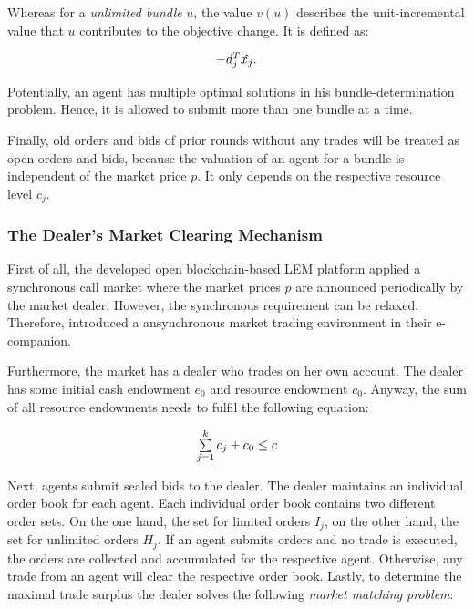 Whereas for a \textit{unlimited bundle} $u$, the value $v(u)$ describes the 
unit-incremental value that $u$ contributes to the objective change. It is defined
as:

\begin{equation*}
    \begin{array}{ll@{}ll}
        -d_{j}^{T}\hat{x_{j}}.
    \end{array}
\end{equation*}

Potentially, an agent has multiple optimal solutions in 
his bundle-determination problem. Hence, it is allowed to submit more than 
one bundle at a time. 

Finally, old orders and bids of prior rounds without any trades will be treated 
as open orders and bids, because the valuation of an agent for a bundle is
independent of the market price $p$.
It only depends on the respective resource level $c_{j}$. 

\subsubsection{The Dealer’s Market Clearing Mechanism}
\label{sec:market_clearing_mechanism}
First of all, the developed open blockchain-based LEM platform applied a synchronous 
call market where the market prices $p$ are announced periodically by the market dealer. 
However, the synchronous requirement can be relaxed. 
Therefore,  introduced a ansynchronous market trading 
environment in their e-companion. 

Furthermore, the market has a dealer who trades on her own account. 
The dealer has some initial cash endowment $e_{0}$ and resource endowment $c_{0}$.
Anyway, the sum of all resource endowments needs to fulfil the following equation:

\begin{equation*}
    \begin{array}{ll@{}ll}
        \sum\limits_{j=1}^{k} c_{j} + c_{0} \leq c
    \end{array}
\end{equation*}

Next, agents submit sealed bids to the dealer. The dealer maintains an 
individual order book for each agent. Each individual order book contains 
two different order sets. On the one hand, the set for limited orders $I_{j}$,
on the other hand, the set for unlimited orders $H_{j}$.
If an agent submits orders and no trade is executed, the orders are collected and 
accumulated for the respective agent. Otherwise, any trade from an agent will clear 
the respective order book. 
Lastly, to determine the maximal trade surplus the dealer solves 
the following \textit{market matching problem}:

